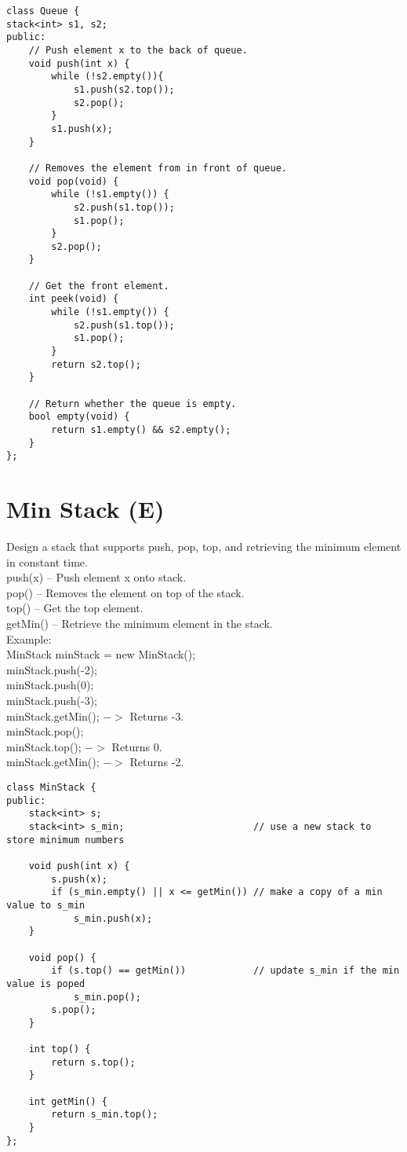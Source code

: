 \begin{lstlisting}
class Queue {
stack<int> s1, s2;
public:
    // Push element x to the back of queue.
    void push(int x) {
        while (!s2.empty()){
            s1.push(s2.top());
            s2.pop();
        }
        s1.push(x);
    }

    // Removes the element from in front of queue.
    void pop(void) {
        while (!s1.empty()) {
            s2.push(s1.top());
            s1.pop();
        }
        s2.pop();
    }

    // Get the front element.
    int peek(void) {
        while (!s1.empty()) {
            s2.push(s1.top());
            s1.pop();
        }
        return s2.top();
    }

    // Return whether the queue is empty.
    bool empty(void) {
        return s1.empty() && s2.empty();
    }
};
\end{lstlisting}


\section{Min Stack (E)}
 Design a stack that supports push, pop, top, and retrieving the minimum element in constant time.\\

    push(x) -- Push element x onto stack.\\
    pop() -- Removes the element on top of the stack.\\
    top() -- Get the top element.\\
    getMin() -- Retrieve the minimum element in the stack.\\
    
Example:\\
MinStack minStack = new MinStack();\\
minStack.push(-2);\\
minStack.push(0);\\
minStack.push(-3);\\
minStack.getMin();   $->$ Returns -3.\\
minStack.pop();\\
minStack.top();      $->$ Returns 0.\\
minStack.getMin();   $->$ Returns -2.\\

\begin{lstlisting}
class MinStack {
public:
    stack<int> s;
    stack<int> s_min;                       // use a new stack to store minimum numbers
    
    void push(int x) {
        s.push(x);
        if (s_min.empty() || x <= getMin()) // make a copy of a min value to s_min
            s_min.push(x);
    }
    
    void pop() {
        if (s.top() == getMin())            // update s_min if the min value is poped
            s_min.pop();
        s.pop();
    }
    
    int top() {
        return s.top();
    }
    
    int getMin() {
        return s_min.top();
    }
};
\end{lstlisting}


